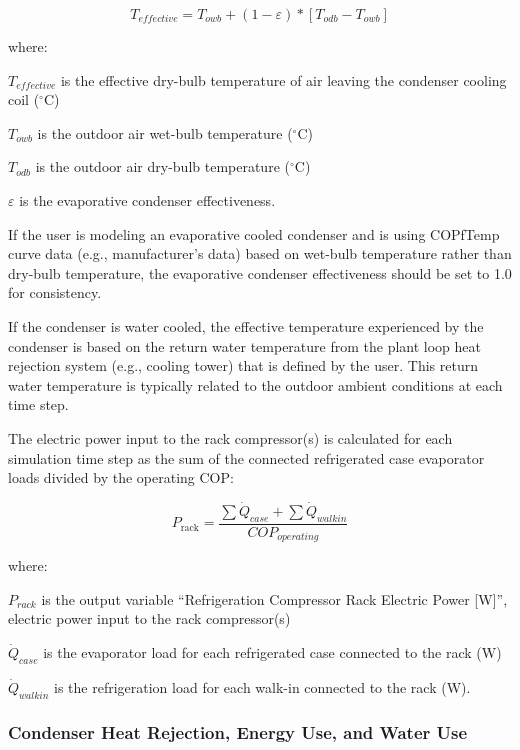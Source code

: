 \begin{equation}
{T_{effective}} = {T_{owb}} + (1 - \varepsilon )*[{T_{odb}} - {T_{owb}}]
\end{equation}

where:

\({T_{effective}}\) is the effective dry-bulb temperature of air leaving the condenser cooling coil (\(^{\circ}\)C)

\({T_{owb}}\) is the outdoor air wet-bulb temperature (\(^{\circ}\)C)

\({T_{odb}}\) is the outdoor air dry-bulb temperature (\(^{\circ}\)C)

\(\varepsilon\) is the evaporative condenser effectiveness.

If the user is modeling an evaporative cooled condenser and is using COPfTemp curve data (e.g., manufacturer's data) based on wet-bulb temperature rather than dry-bulb temperature, the evaporative condenser effectiveness should be set to 1.0 for consistency.

If the condenser is water cooled, the effective temperature experienced by the condenser is based on the return water temperature from the plant loop heat rejection system (e.g., cooling tower) that is defined by the user. This return water temperature is typically related to the outdoor ambient conditions at each time step.

The electric power input to the rack compressor(s) is calculated for each simulation time step as the sum of the connected refrigerated case evaporator loads divided by the operating COP:

\begin{equation}
{P_{{\mathrm{rack}}}} = \frac{{\sum {{{\dot Q}_{case}} + \sum {{{\dot Q}_{walkin}}} } }}{{CO{P_{operating}}}}
\end{equation}

where:

\({P_{rack}}\) is the output variable ``Refrigeration Compressor Rack Electric Power {[}W{]}'', electric power input to the rack compressor(s)

\({\dot Q_{case}}\) is the evaporator load for each refrigerated case connected to the rack (W)

\({\dot Q_{walkin}}\) is the refrigeration load for each walk-in connected to the rack (W).

\subsubsection{Condenser Heat Rejection, Energy Use, and Water Use}\label{condenser-heat-rejection-energy-use-and-water-use}

